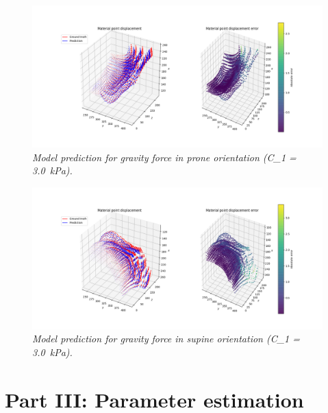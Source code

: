 \documentclass[11pt]{article}
\begin{document}
\begin{figure}
\centering
\includegraphics[scale=1.0]{Images/breast/surrogate_model/3.0_prone_model.png}
\caption{\textit{\label{fig8}Model prediction for gravity force in prone orientation (C_1 = \SI{3.0}{kPa}).}}
\end{figure}

\begin{figure}
\centering
\includegraphics[scale=1.0]{Images/breast/surrogate_model/3.0_supine_model.png}
\caption{\textit{\label{fig9}Model prediction for gravity force in supine orientation (C_1 = \SI{3.0}{kPa}).}}
\end{figure}

\pagebreak

\section{Part III: Parameter estimation}
\end{document}
